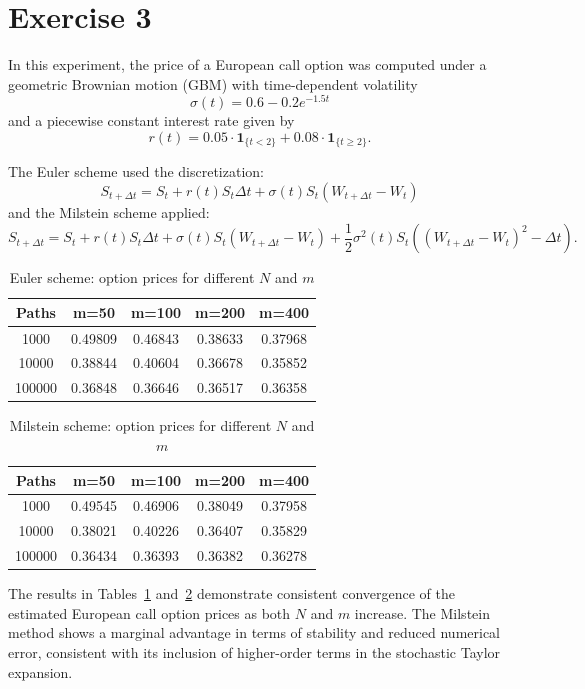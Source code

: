 \section{Exercise 3}


In this experiment, the price of a European call option was computed under a geometric Brownian motion (GBM) with time-dependent volatility
\[
\sigma(t) = 0.6 - 0.2e^{-1.5t}
\]
and a piecewise constant interest rate given by
\[
r(t) = 0.05 \cdot \mathbf{1}_{\{t < 2\}} + 0.08 \cdot \mathbf{1}_{\{t \geq 2\}}.
\]


The Euler scheme used the discretization:
\[
S_{t+\Delta t} = S_t + r(t) S_t \Delta t + \sigma(t) S_t (W_{t+\Delta t} - W_t)
\]
and the Milstein scheme applied:
\[
S_{t+\Delta t} = S_t + r(t) S_t \Delta t + \sigma(t) S_t (W_{t+\Delta t} - W_t) + \frac{1}{2} \sigma^2(t) S_t \left((W_{t+\Delta t} - W_t)^2 - \Delta t\right).
\]

\begin{table}[h!]
\centering
\label{tab:euler}
\begin{tabular}{|c|cccc|}
\hline
\textbf{Paths} & \textbf{m=50} & \textbf{m=100} & \textbf{m=200} & \textbf{m=400} \\
\hline
1000    & 0.49809 & 0.46843 & 0.38633 & 0.37968 \\
10000   & 0.38844 & 0.40604 & 0.36678 & 0.35852 \\
100000  & 0.36848 & 0.36646 & 0.36517 & 0.36358 \\
\hline
\end{tabular}
\caption{Euler scheme: option prices for different \(N\) and \(m\)}
\end{table}

\begin{table}[h!]
\centering
\label{tab:milstein}
\begin{tabular}{|c|cccc|}
\hline
\textbf{Paths} & \textbf{m=50} & \textbf{m=100} & \textbf{m=200} & \textbf{m=400} \\
\hline
1000    & 0.49545 & 0.46906 & 0.38049 & 0.37958 \\
10000   & 0.38021 & 0.40226 & 0.36407 & 0.35829 \\
100000  & 0.36434 & 0.36393 & 0.36382 & 0.36278 \\
\hline
\end{tabular}
\caption{Milstein scheme: option prices for different \(N\) and \(m\)}
\end{table}

The results in Tables~\ref{tab:euler} and~\ref{tab:milstein} demonstrate consistent convergence of the estimated European call option prices as both \(N\) and \(m\) increase. The Milstein method shows a marginal advantage in terms of stability and reduced numerical error, consistent with its inclusion of higher-order terms in the stochastic Taylor expansion.

